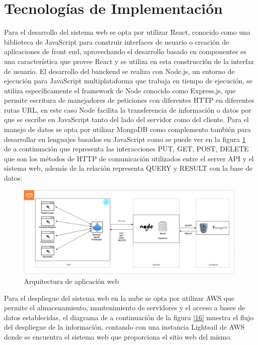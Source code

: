 \documentclass[12pt]{article}
\begin{document}
\newpage

\section{Tecnologías de Implementación}

Para el desarrollo del sistema web se opta por utilizar React, conocido como una biblioteca de JavaScript para construir interfaces de usuario o creación de aplicaciones de front end, aprovechando el desarrollo basado en componentes es una característica que provee React y se utiliza en esta construcción de la interfaz de usuario. El desarrollo del banckend se realiza con Node.js, un entorno de ejecución para JavaScript multiplataforma que trabaja en tiempo de ejecución, se utiliza específicamente el framework de Node conocido como Express.js, que permite escritura de manejadores de peticiones con diferentes HTTP en diferentes rutas URL, en este caso Node facilita la transferencia de información o datos por que se escribe en JavaScript tanto del lado del servidor como del cliente. Para el manejo de datos se opta por utilizar MongoDB como complemento también para desarrollar en lenguajes basados en JavaScript como se puede ver en la figura \ref{15} de a continuación que representa las interacciones PUT, GET, POST, DELETE que son los métodos de HTTP de comunicación utilizados entre el server API y el sistema web, además de la relación representa QUERY y RESULT con la base de datos:

\begin{figure}[ht]
\centering
\includegraphics[scale=0.4]{imag/ArquAWS.png}
\caption{Arquitectura de aplicación web }
\label{15}
\end{figure}
\FloatBarrier

Para el despliegue del sistema web en la nube se opta por utilizar AWS que permite el almacenamiento, mantenimiento de servidores y el acceso a bases de datos establecidas, el diagrama de a continuación de la figura \ref{16} muestra el flujo del despliegue de la información, contando con una instancia Lightsail de AWS donde se encuentra el sistema web que proporciona el sitio web del mismo.
\end{document}
